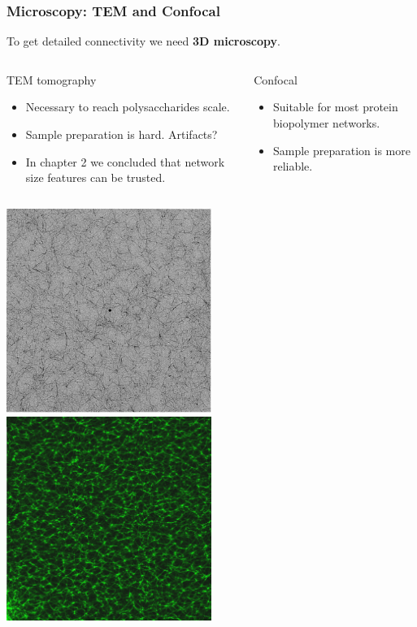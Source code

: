 \documentclass[9pt]{beamer}
\begin{document}
\begin{frame}
  \frametitle{Microscopy: TEM and Confocal}
  To get detailed connectivity we need \textbf{3D microscopy}.
  \begin{columns}[T,onlytextwidth]
      \begin{exampleblock}{TEM tomography}
          \begin{itemize}
              \item Necessary to reach polysaccharides scale.
              \item Sample preparation is hard. Artifacts?
              \item In chapter 2 we concluded that network size features can be trusted.
          \end{itemize}
      \end{exampleblock}
      \begin{exampleblock}{Confocal}
          \begin{itemize}
              \item Suitable for most protein biopolymer networks.
              \item Sample preparation is more reliable.
          \end{itemize}
      \end{exampleblock}
  \end{columns}
  \begin{columns}[T,onlytextwidth]
      \centering\includegraphics[width=0.5\textwidth]{./Figures/image_tem.png}
      \centering\includegraphics[width=0.5\textwidth]{./Figures/image_confocal.png}
  \end{columns}
\end{frame}
\end{document}
